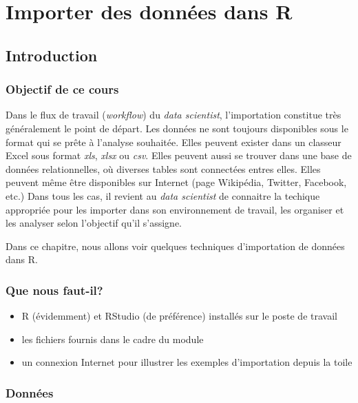 \documentclass[]{book}
\begin{document}
\chapter{Importer des données dans R}\label{importer-des-donnees-dans-r}

\section{Introduction}\label{introduction-3}

\subsection{Objectif de ce cours}\label{objectif-de-ce-cours}

Dans le flux de travail (\emph{workflow}) du \emph{data scientist},
l'importation constitue très généralement le point de départ. Les
données ne sont toujours disponibles sous le format qui se prête à
l'analyse souhaitée. Elles peuvent exister dans un classeur Excel sous
format \emph{xls}, \emph{xlsx} ou \emph{csv}. Elles peuvent aussi se
trouver dans une base de données relationnelles, où diverses tables sont
connectées entres elles. Elles peuvent même être disponibles sur
Internet (page Wikipédia, Twitter, Facebook, etc.) Dans tous les cas, il
revient au \emph{data scientist} de connaitre la techique appropriée
pour les importer dans son environnement de travail, les organiser et
les analyser selon l'objectif qu'il s'assigne.

Dans ce chapitre, nous allons voir quelques techniques d'importation de
données dans R.

\subsection{Que nous faut-il?}\label{que-nous-faut-il}

\begin{itemize}
\item
  R (évidemment) et RStudio (de préférence) installés sur le poste de
  travail
\item
  les fichiers fournis dans le cadre du module
\item
  un connexion Internet pour illustrer les exemples d'importation depuis
  la toile
\end{itemize}

\subsection{Données}\label{donnees-1}
\end{document}
